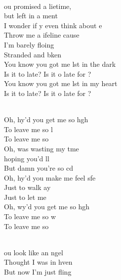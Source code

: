 \begin{cancion}%
	       \\
	ou promised a lietime, \\
	but left in a ment\\
	I wonder if y even think about e\\
	Throw me a ifeline cause \\
	I'm barely floing\\
	Stranded and bken\\
\jump
	You know you got me lst in the dark\\
	Is it to late? Is it o late for ?\\
	You know you got me lst in my heart\\
	Is it to late? Is it o late for ?\\\jump\\
	\begin{chorus}%
	Oh, hy'd you get me so hgh\\
	To leave me so l\\
	To leave me so\\
	Oh,  was wasting my tme \\
	hoping you'd ll\\
	But damn you're so cd\\
	Oh, hy'd you make me feel sfe\\
	Just to walk ay\\
	Just to let me \\
	Oh, wy'd you get me so hgh\\
	To leave me so w\\
	To leave me so\\
	\end{chorus}%
	\jump\\
	ou look like an ngel\\
	Thought I was in hven\\
	But now I'm just fling \\

\end{cancion}
